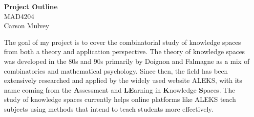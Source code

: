 \documentclass[11pt,letterpaper,dvipsnames]{article}
\begin{document}
\begin{center}
    \begin{large}
        \textbf{Project Outline} \\
        MAD4204 \\ 
        Carson Mulvey
    \end{large}
\end{center}

\pagestyle{empty}

The goal of my project is to cover the combinatorial study of knowledge spaces from both a theory and application perspective. The theory of knowledge spaces was developed in the 80s and 90s primarily by Doignon and Falmagne as a mix of combinatorics and mathematical psychology. Since then, the field has been extensively researched and applied by the widely used website ALEKS, with its name coming from the \textbf{A}ssessment and \textbf{LE}arning in \textbf{K}nowledge \textbf{S}paces. The study of knowledge spaces currently helps online platforms like ALEKS teach subjects using methods that intend to teach students more effectively.
\end{document}
